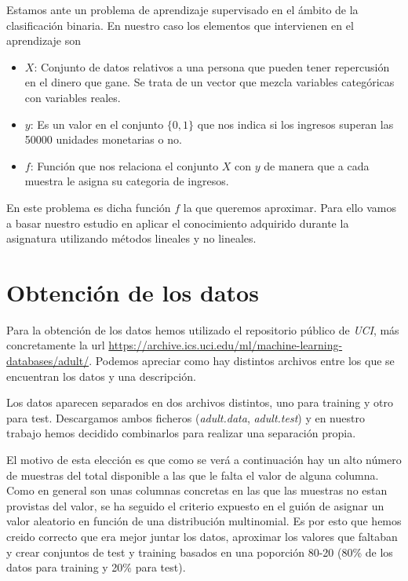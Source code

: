 \documentclass[11pt]{article}
\begin{document}
Estamos ante un problema de aprendizaje supervisado en el ámbito de la
clasificación binaria. En nuestro caso los elementos que intervienen en el
aprendizaje son 

\begin{itemize}
    \item $X$: Conjunto de datos relativos a una persona que pueden tener
    repercusión en el dinero que gane. Se trata de un vector que mezcla
    variables categóricas con variables reales.
    \item $y$: Es un valor en el conjunto $\{0,1\}$ que nos indica si los
    ingresos superan las 50000 unidades monetarias o no.
    \item $f$: Función que nos relaciona el conjunto $X$ con $y$ de manera que a
    cada muestra le asigna su categoria de ingresos.
\end{itemize}

En este problema es dicha función $f$ la que queremos aproximar. Para ello vamos
a basar nuestro estudio en aplicar el conocimiento adquirido durante la
asignatura utilizando métodos lineales y no lineales.

\section{Obtención de los datos}

Para la obtención de los datos hemos utilizado el repositorio público de
\textit{UCI}, más concretamente la url
\href{https://archive.ics.uci.edu/ml/machine-learning-databases/adult/}{https://archive.ics.uci.edu/ml/machine-learning-databases/adult/}.
Podemos apreciar como hay distintos archivos entre los que se encuentran los
datos y una descripción. 

Los datos aparecen separados en dos archivos distintos, uno para training y otro
para test. Descargamos ambos ficheros (\textit{adult.data}, \textit{adult.test})
y en nuestro trabajo hemos decidido combinarlos para realizar una separación
propia.

El motivo de esta elección es que como se verá a continuación hay un alto número
de muestras del total disponible a las que le falta el valor de alguna columna.
Como en general son unas columnas concretas en las que las muestras no estan
provistas del valor, se ha seguido el criterio expuesto en el guión de asignar
un valor aleatorio en función de una distribución multinomial. Es por esto que
hemos creido correcto que era mejor juntar los datos, aproximar los valores que
faltaban y crear conjuntos de test y training basados en una poporción 80-20
(80\% de los datos para training y 20\% para test).
\end{document}
